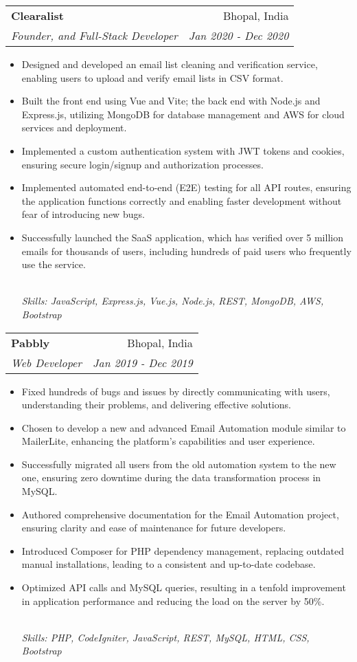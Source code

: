 \documentclass[letterpaper,12pt]{article}
\makeatletter
\newcommand{\resumeItem}[1]{
  \item\small{#1}\vspace{-2pt}
}
\newcommand{\resumeSubheading}[4]{
  \vspace{-2pt}\item
    \begin{tabular*}{0.97\textwidth}[t]{l@{\extracolsep{\fill}}r}
      \textbf{#1} & \small{#2} \\
      \textit{\small{#3}} & \textit{\small{#4}} \\
    \end{tabular*}\vspace{-5pt}
}
\newcommand{\resumeItemFooter}[1]{
    \\ \vspace{7pt}\hspace{-0.35in}\footnotesize\emph{#1}
}
\newcommand{\resumeItemListStart}{\begin{itemize}}
\newcommand{\resumeItemListEnd}{\end{itemize}\vspace{-5pt}}
\def\myHometown{Bhopal, India}
\makeatother
\begin{document}
\resumeSubheading
{Clearalist}{\myHometown}
{Founder, and Full-Stack Developer}{Jan 2020 - Dec 2020}
\resumeItemListStart
\resumeItem{Designed and developed an email list cleaning and verification service, enabling users to upload and verify email lists in CSV format.}
\resumeItem{Built the front end using Vue and Vite; the back end with Node.js and Express.js, utilizing MongoDB for database management and AWS for cloud services and deployment.}
\resumeItem{Implemented a custom authentication system with JWT tokens and cookies, ensuring secure login/signup and authorization processes.}
\resumeItem{Implemented automated end-to-end (E2E) testing for all API routes, ensuring the application functions correctly and enabling faster development without fear of introducing new bugs.}
\resumeItem{Successfully launched the SaaS application, which has verified over 5 million emails for thousands of users, including hundreds of paid users who frequently use the service.}
\resumeItemFooter{Skills: JavaScript, Express.js, Vue.js, Node.js, REST, MongoDB, AWS, Bootstrap}
\resumeItemListEnd

\resumeSubheading
{Pabbly}{\myHometown}
{Web Developer}{Jan 2019 - Dec 2019}
\resumeItemListStart
\resumeItem{Fixed hundreds of bugs and issues by directly communicating with users, understanding their problems, and delivering effective solutions.}
\resumeItem{Chosen to develop a new and advanced Email Automation module similar to MailerLite, enhancing the platform's capabilities and user experience.}
\resumeItem{Successfully migrated all users from the old automation system to the new one, ensuring zero downtime during the data transformation process in MySQL.}
\resumeItem{Authored comprehensive documentation for the Email Automation project, ensuring clarity and ease of maintenance for future developers.}
\resumeItem{Introduced Composer for PHP dependency management, replacing outdated manual installations, leading to a consistent and up-to-date codebase.}
\resumeItem{Optimized API calls and MySQL queries, resulting in a tenfold improvement in application performance and reducing the load on the server by 50\%.}
\resumeItemFooter{Skills: PHP, CodeIgniter, JavaScript, REST, MySQL, HTML, CSS, Bootstrap}
\resumeItemListEnd
\end{document}
